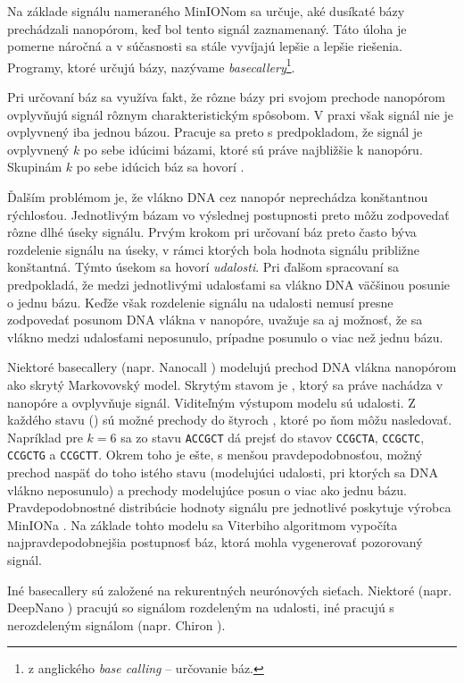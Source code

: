 Na základe signálu nameraného MinIONom sa určuje, aké dusíkaté bázy prechádzali nanopórom, keď bol
tento signál zaznamenaný. Táto úloha je pomerne náročná a v súčasnosti sa stále vyvíjajú lepšie a
lepšie riešenia. Programy, ktoré určujú bázy, nazývame \emph{basecallery}\footnote{z anglického \emph{base calling} -- určovanie báz.}.

Pri určovaní báz sa využíva fakt, že rôzne bázy pri svojom prechode nanopórom ovplyvňujú signál
rôznym charakteristickým spôsobom. V praxi však signál nie je ovplyvnený iba jednou bázou. Pracuje
sa preto s predpokladom, že signál je ovplyvnený $k$ po sebe idúcimi bázami, ktoré sú práve najbližšie
k nanopóru. Skupinám $k$ po sebe idúcich báz sa hovorí \emph{}.

Ďalším problémom je, že vlákno DNA cez nanopór neprechádza konštantnou rýchlosťou. Jednotlivým bázam vo 
výslednej postupnosti preto môžu zodpovedať rôzne dlhé úseky signálu. Prvým krokom pri určovaní báz 
preto často býva rozdelenie signálu na úseky, v rámci ktorých bola hodnota signálu približne konštantná.
Týmto úsekom sa hovorí \emph{udalosti}. Pri ďalšom spracovaní sa predpokladá, že medzi jednotlivými 
udalosťami sa vlákno DNA väčšinou posunie o jednu bázu. Keďže však rozdelenie signálu na udalosti nemusí
presne zodpovedať posunom DNA vlákna v nanopóre, uvažuje sa aj možnosť, že sa vlákno medzi udalosťami 
neposunulo, prípadne posunulo o viac než jednu bázu.


Niektoré basecallery (napr. Nanocall \cite{Nanocall2017}) modelujú prechod DNA vlákna nanopórom ako 
skrytý Markovovský model. Skrytým stavom je \kmer{}, ktorý sa práve nachádza v nanopóre a ovplyvňuje 
signál. Viditeľným výstupom modelu sú udalosti. Z každého stavu () sú možné prechody do štyroch 
, ktoré po ňom môžu nasledovať. Napríklad pre $k=6$ sa zo stavu \texttt{ACCGCT} dá prejsť do
stavov \texttt{CCGCTA}, \texttt{CCGCTC}, \texttt{CCGCTG} a \texttt{CCGCTT}. Okrem toho je ešte, s menšou 
pravdepodobnosťou, možný prechod naspäť do toho istého stavu (modelujúci udalosti, pri ktorých sa DNA 
vlákno neposunulo) a prechody modelujúce posun o viac ako jednu bázu. Pravdepodobnostné distribúcie 
hodnoty signálu pre jednotlivé  poskytuje výrobca MinIONa \cite{KmerModels}. Na základe tohto
modelu sa Viterbiho algoritmom vypočíta najpravdepodobnejšia postupnosť báz, ktorá mohla vygenerovať 
pozorovaný signál.

Iné basecallery sú založené na rekurentných neurónových sieťach. Niektoré (napr. DeepNano 
\cite{DeepNano2017}) pracujú so signálom rozdeleným na udalosti, iné pracujú s nerozdeleným signálom 
(napr. Chiron \cite{Chiron2017}).

